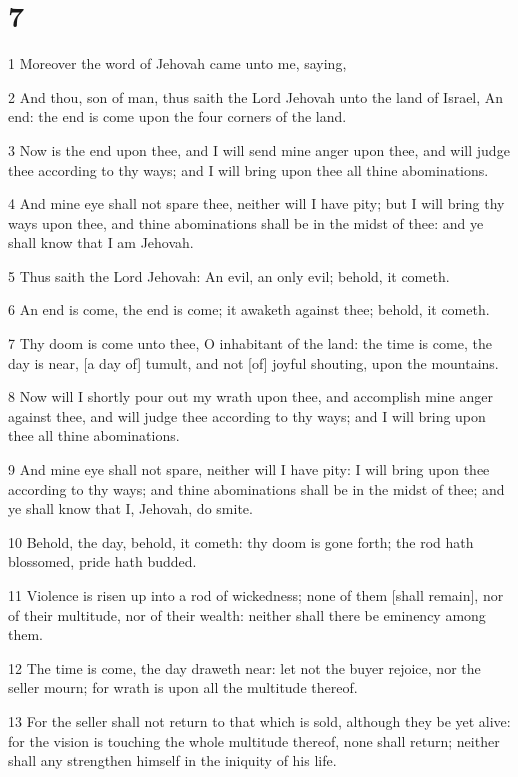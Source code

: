 \chapter{7}

\par 1 Moreover the word of Jehovah came unto me, saying,
\par 2 And thou, son of man, thus saith the Lord Jehovah unto the land of Israel, An end: the end is come upon the four corners of the land.
\par 3 Now is the end upon thee, and I will send mine anger upon thee, and will judge thee according to thy ways; and I will bring upon thee all thine abominations.
\par 4 And mine eye shall not spare thee, neither will I have pity; but I will bring thy ways upon thee, and thine abominations shall be in the midst of thee: and ye shall know that I am Jehovah.
\par 5 Thus saith the Lord Jehovah: An evil, an only evil; behold, it cometh.
\par 6 An end is come, the end is come; it awaketh against thee; behold, it cometh.
\par 7 Thy doom is come unto thee, O inhabitant of the land: the time is come, the day is near, [a day of] tumult, and not [of] joyful shouting, upon the mountains.
\par 8 Now will I shortly pour out my wrath upon thee, and accomplish mine anger against thee, and will judge thee according to thy ways; and I will bring upon thee all thine abominations.
\par 9 And mine eye shall not spare, neither will I have pity: I will bring upon thee according to thy ways; and thine abominations shall be in the midst of thee; and ye shall know that I, Jehovah, do smite.
\par 10 Behold, the day, behold, it cometh: thy doom is gone forth; the rod hath blossomed, pride hath budded.
\par 11 Violence is risen up into a rod of wickedness; none of them [shall remain], nor of their multitude, nor of their wealth: neither shall there be eminency among them.
\par 12 The time is come, the day draweth near: let not the buyer rejoice, nor the seller mourn; for wrath is upon all the multitude thereof.
\par 13 For the seller shall not return to that which is sold, although they be yet alive: for the vision is touching the whole multitude thereof, none shall return; neither shall any strengthen himself in the iniquity of his life.
